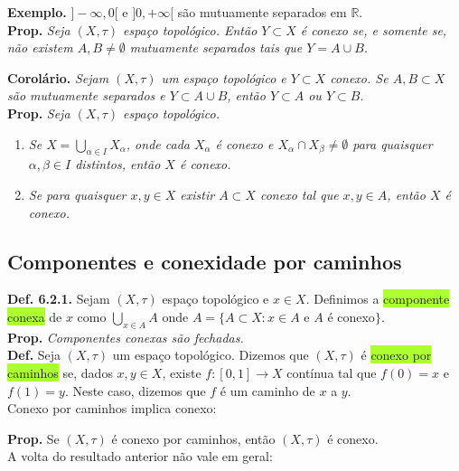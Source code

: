 \documentclass{article}
\begin{document}
\begin{landscape}
\begin{multicols}{3}
\textbf{Exemplo.} $]-\infty, 0[$ e $]0, +\infty[$ são mutuamente separados em $\mathbb{R}$.\\

\textbf{Prop.} \textit{Seja $(X, \tau)$ espaço topológico. Então $Y \subset X$ é conexo se, e somente se, não existem $A, B \neq \emptyset$ mutuamente separados tais que $Y = A \cup B$.}

\textbf{Corolário.} \textit{Sejam $(X, \tau)$ um espaço topológico e $Y \subset X$ conexo. Se $A, B \subset X$ são mutuamente separados e $Y \subset A \cup B$, então $Y \subset A$ ou $Y \subset B$.}\\

\textbf{Prop.} \textit{Seja $(X, \tau)$ espaço topológico.}
\begin{enumerate}
    \item \textit{Se $X = \bigcup_{\alpha \in I} X_\alpha$, onde cada $X_\alpha$ é conexo e $X_\alpha \cap X_\beta \neq \emptyset$ para quaisquer $\alpha, \beta \in I$ distintos, então $X$ é conexo.}
    \item \textit{Se para quaisquer $x, y \in X$ existir $A \subset X$ conexo tal que $x, y \in A$, então $X$ é conexo.}
\end{enumerate}

\subsection{Componentes e conexidade por caminhos}
\textbf{Def. 6.2.1.} Sejam $(X,\tau)$ espaço topológico e $x \in X$. Definimos a \colorbox{GreenYellow}{componente conexa} de $x$ como $\bigcup_{x \in A} A$ onde $A = \{A \subset X : x \in A$ e $A$ é conexo$\}$.\\

\textbf{Prop.} \textit{Componentes conexas são fechadas.}\\

\textbf{Def.} Seja $(X,\tau)$ um espaço topológico. Dizemos que $(X,\tau)$ é \colorbox{GreenYellow}{conexo por caminhos} se, dados $x,y \in X$, existe $f : [0,1] \to X$ contínua tal que $f(0) = x$ e $f(1) = y$. Neste caso, dizemos que $f$ é um caminho de $x$ a $y$.\\

\color{Emerald}Conexo por caminhos implica conexo:\color{black}

\textbf{Prop.} Se $(X,\tau)$ é conexo por caminhos, então $(X,\tau)$ é conexo.\\

\color{Emerald}A volta do resultado anterior não vale em geral:\color{black}


\end{multicols}
\end{landscape}
\end{document}
